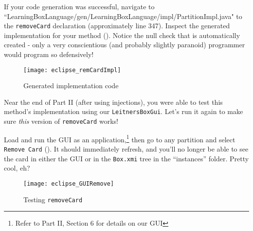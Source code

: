 \begin{stepbystep}

\item If your code generation was successful, navigate to
``Learning\-Box\-Language/\-gen/\-Learning\-Box\-Language/\-impl/\-Partition\-Impl.java" to the \texttt{\-remove\-Card} declaration (approximately line 347).
Inspect the generated implementation for your method (). Notice the null check that is automatically created - only a very
conscientious (and probably slightly paranoid) programmer would program so defensively!

\vspace{0.5cm}

\begin{figure}[htp]
\begin{center}
  \texttt{[image: eclipse\_remCardImpl]}
  \caption{Generated implementation code}
  \label{eclipse:remCardImpl}
\end{center}
\end{figure}

\newpage

Near the end of Part II (after using injections), you were able to test this method's implementation using our \texttt{LeitnersBoxGui}. Let's run it again to
make sure \emph{this} version of \texttt{removeCard} works!

\item Load and run the GUI as an application,\footnote{Refer to Part II, Section 6 for details on our GUI} then go to any partition and
select \texttt{Remove Card} ().
It should immediately refresh, and you'll no longer be able to see the card in either the GUI or in the \texttt{Box.xmi} tree in the ``instances'' folder.
Pretty cool, eh?

\vspace{1cm}

\begin{figure}[htp]
\begin{center}
  \texttt{[image: eclipse\_GUIRemove]}
  \caption{Testing \texttt{removeCard}}
  \label{eclipse:GUIRemCard}
\end{center}
\end{figure}

\end{stepbystep}